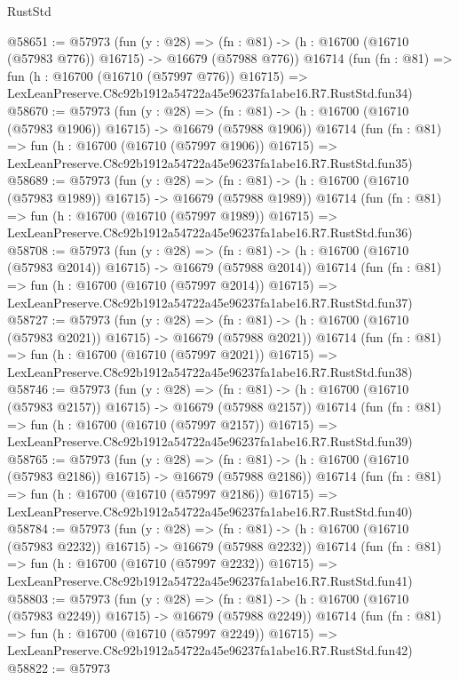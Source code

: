 \begin{lexlean}{RustStd}
\begin{coremodule}
@58651 := @57973
    (fun (y : @28) =>
    (fn : @81) -> (h : @16700 (@16710 (@57983 @776)) @16715) -> @16679 (@57988 @776))
    @16714
    (fun (fn : @81) =>
    fun (h : @16700 (@16710 (@57997 @776)) @16715) =>
    LexLeanPreserve.C8c92b1912a54722a45e96237fa1abe16.R7.RustStd.fun34)
@58670 := @57973
    (fun (y : @28) =>
    (fn : @81) -> (h : @16700 (@16710 (@57983 @1906)) @16715) -> @16679 (@57988 @1906))
    @16714
    (fun (fn : @81) =>
    fun (h : @16700 (@16710 (@57997 @1906)) @16715) =>
    LexLeanPreserve.C8c92b1912a54722a45e96237fa1abe16.R7.RustStd.fun35)
@58689 := @57973
    (fun (y : @28) =>
    (fn : @81) -> (h : @16700 (@16710 (@57983 @1989)) @16715) -> @16679 (@57988 @1989))
    @16714
    (fun (fn : @81) =>
    fun (h : @16700 (@16710 (@57997 @1989)) @16715) =>
    LexLeanPreserve.C8c92b1912a54722a45e96237fa1abe16.R7.RustStd.fun36)
@58708 := @57973
    (fun (y : @28) =>
    (fn : @81) -> (h : @16700 (@16710 (@57983 @2014)) @16715) -> @16679 (@57988 @2014))
    @16714
    (fun (fn : @81) =>
    fun (h : @16700 (@16710 (@57997 @2014)) @16715) =>
    LexLeanPreserve.C8c92b1912a54722a45e96237fa1abe16.R7.RustStd.fun37)
@58727 := @57973
    (fun (y : @28) =>
    (fn : @81) -> (h : @16700 (@16710 (@57983 @2021)) @16715) -> @16679 (@57988 @2021))
    @16714
    (fun (fn : @81) =>
    fun (h : @16700 (@16710 (@57997 @2021)) @16715) =>
    LexLeanPreserve.C8c92b1912a54722a45e96237fa1abe16.R7.RustStd.fun38)
@58746 := @57973
    (fun (y : @28) =>
    (fn : @81) -> (h : @16700 (@16710 (@57983 @2157)) @16715) -> @16679 (@57988 @2157))
    @16714
    (fun (fn : @81) =>
    fun (h : @16700 (@16710 (@57997 @2157)) @16715) =>
    LexLeanPreserve.C8c92b1912a54722a45e96237fa1abe16.R7.RustStd.fun39)
@58765 := @57973
    (fun (y : @28) =>
    (fn : @81) -> (h : @16700 (@16710 (@57983 @2186)) @16715) -> @16679 (@57988 @2186))
    @16714
    (fun (fn : @81) =>
    fun (h : @16700 (@16710 (@57997 @2186)) @16715) =>
    LexLeanPreserve.C8c92b1912a54722a45e96237fa1abe16.R7.RustStd.fun40)
@58784 := @57973
    (fun (y : @28) =>
    (fn : @81) -> (h : @16700 (@16710 (@57983 @2232)) @16715) -> @16679 (@57988 @2232))
    @16714
    (fun (fn : @81) =>
    fun (h : @16700 (@16710 (@57997 @2232)) @16715) =>
    LexLeanPreserve.C8c92b1912a54722a45e96237fa1abe16.R7.RustStd.fun41)
@58803 := @57973
    (fun (y : @28) =>
    (fn : @81) -> (h : @16700 (@16710 (@57983 @2249)) @16715) -> @16679 (@57988 @2249))
    @16714
    (fun (fn : @81) =>
    fun (h : @16700 (@16710 (@57997 @2249)) @16715) =>
    LexLeanPreserve.C8c92b1912a54722a45e96237fa1abe16.R7.RustStd.fun42)
@58822 := @57973

\end{coremodule}
\end{lexlean}
